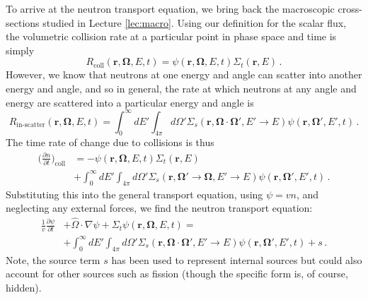 To arrive at the neutron transport equation, we bring back the macroscopic cross-sections studied in Lecture \ref{lec:macro}.  Using our definition for the scalar flux, the volumetric collision rate at a particular point in phase space and time is simply
\begin{equation}
 R_{\text{coll}}(\mathbf{r},\mathbf{\Omega},E,t) = \psi(\mathbf{r},\mathbf{\Omega},E,t) \Sigma_t(\mathbf{r},E) \, .
\end{equation}
However, we know that neutrons at one energy and angle can scatter into another energy and angle, and so in general, the rate at which neutrons at any angle and energy are scattered into a particular energy and angle is
\begin{equation}
 R_{\text{in-scatter}}(\mathbf{r},\mathbf{\Omega},E,t) = \int^{\infty}_{0} dE' \int_{4\pi} d\Omega' \Sigma_s(\mathbf{r},\mathbf{\Omega}\cdot\mathbf{\Omega}',E'\to E)\psi(\mathbf{r},\mathbf{\Omega'},E',t) \, .
\end{equation}
The time rate of change due to collisions is thus
\begin{equation}
\begin{split}
 \Big( \frac{\partial n}{\partial t} \Big )_{\mathrm{coll}} &= -\psi(\mathbf{r},\mathbf{\Omega},E,t) \Sigma_t(\mathbf{r},E)  \\
  &+ \int^{\infty}_{0} dE' \int_{4\pi} d\Omega' \Sigma_s(\mathbf{r},\mathbf{\Omega}'\to \mathbf{\Omega},E'\to E)\psi(\mathbf{r},\mathbf{\Omega'},E',t) \, .
\end{split}
\end{equation}
Substituting this into the general transport equation, using $\psi = vn$, and neglecting any external forces, we find the neutron transport equation:
\begin{equation}
  \begin{split}
     \frac{1}{v}\frac{\partial \psi}{\partial t} &+ \hat{\Omega} \cdot \nabla \psi + \Sigma_t \psi(\mathbf{r},\mathbf{\Omega},E,t) = \\
           &+ \int^{\infty}_{0} dE' \int_{4\pi} d\Omega' \Sigma_s(\mathbf{r},\mathbf{\Omega}\cdot\mathbf{\Omega}',E'\to E)\psi(\mathbf{r},\mathbf{\Omega'},E',t) +s \, .
  \end{split}
  \label{eq:neutrontransport}
\end{equation}
Note, the source term $s$ has been used to represent internal sources but could also account for other sources such as fission (though the specific form is, of course, hidden).

